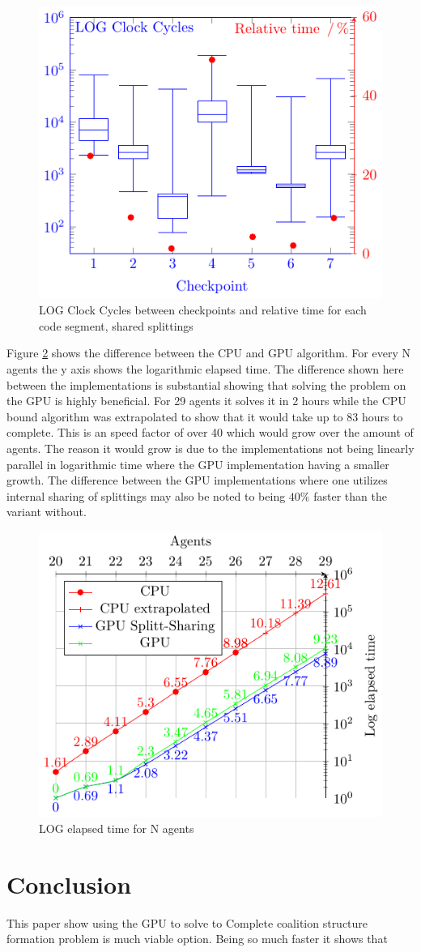 \documentclass{llncs}
\begin{document}
\begin{figure}[htbp]\centering
\includegraphics[width=0.8\columnwidth]{fig2cycles}
\caption{LOG Clock Cycles between checkpoints and relative time for each code segment, shared splittings\label{splitt}}
\end{figure}


Figure \ref{time} shows the difference between the CPU and GPU algorithm.
For every N agents the y axis shows the logarithmic elapsed time. The difference shown here between the implementations is substantial showing
that solving the problem on the GPU is highly beneficial. For 29 agents it solves it in 2 hours while the CPU bound algorithm was extrapolated to show that it would take up to 83 hours to complete. This is an speed factor of over 40 which would grow over the amount of agents. The reason it would grow is due to the implementations not being linearly parallel in logarithmic time where the GPU implementation having a smaller growth.
The difference between the GPU implementations where one utilizes internal 
sharing of splittings may also be noted to being $40\%$ faster than the variant without.

\begin{figure}[htbp]\centering
\includegraphics[width=0.8\columnwidth]{fig1cycles}
\caption{LOG elapsed time for N agents\label{time}}
\end{figure}
\section{Conclusion}
This paper show using the GPU to solve to Complete coalition structure formation problem is much viable option. Being so much faster it shows that

\end{document}

